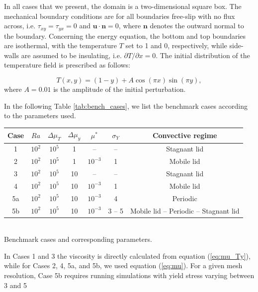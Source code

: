 In all cases that we present, the domain is a two-dimensional square box. The mechanical boundary conditions are for all boundaries free-slip with no flux across, i.e. $\tau_{xy}=\tau_{yx}=0$ and $\boldsymbol{u}\cdot \boldsymbol{n}=0$, where $\boldsymbol{n}$ denotes the outward normal to the boundary. Concerning the energy equation, the bottom and top boundaries are isothermal, with the temperature $T$ set to 1 and 0, respectively, while side-walls are assumed to be insulating, i.e. $\partial T/\partial x = 0$. The initial distribution of the temperature field is prescribed as follows:

\begin{equation}
T(x,y) = (1-y) + A \cos(\pi x)\sin(\pi y), \label{eq:initemp}
\end{equation}
where $A=0.01$ is the amplitude of the initial perturbation.


In the following Table \ref{tab:bench_cases}, we list the benchmark cases according to the parameters used. 


\begin{center}
\begin{tabular}{c c c c c c c} 
\hline
Case & $Ra$ & $\Delta\mu_T$ & $\Delta\mu_y$ & $\mu^*$ & $\sigma_Y$ & Convective regime \\
\hline
1   & $10^2$ & $10^5$    & 1  & -- & --             & Stagnant lid    \\
2   & $10^2$ & $10^5$    & 1  & $10^{-3}$ & 1       & Mobile lid \\
3   & $10^2$ & $10^5$    & 10 & --  & --            & Stagnant lid \\
4   & $10^2$ & $10^5$    & 10 & $10^{-3}$ & 1       & Mobile lid  \\
5a  & $10^2$ & $10^5$    & 10 & $10^{-3}$ & 4       & Periodic  \\
5b  & $10^2$ & $10^5$    & 10 & $10^{-3}$ & 3 -- 5  & Mobile lid -- Periodic -- Stagnant lid \\
\hline
\end{tabular}\\
{\small Benchmark cases and corresponding parameters.} 
\end{center}

In Cases 1 and 3 the viscosity is directly calculated from equation (\ref{eq:mu_Ty}), while for Cases 2, 4, 5a, and 5b, we used equation (\ref{eq:mu}). For a given mesh resolution, Case 5b requires running simulations with yield stress varying between 3 and 5


